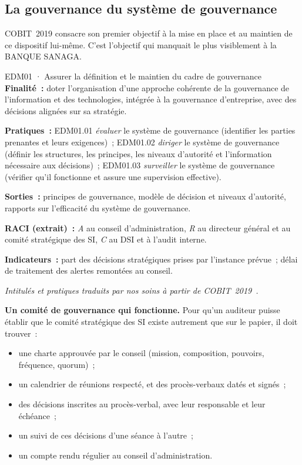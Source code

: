 \subsection{La gouvernance du système de gouvernance}

COBIT~2019 consacre son premier objectif à la mise en place et au maintien
de ce dispositif lui-même. C'est l'objectif qui manquait le plus
visiblement à la BANQUE SANAGA.

\begin{boxobjet}{EDM01 · Assurer la définition et le maintien du cadre de gouvernance}
\textbf{Finalité~:} doter l'organisation d'une approche cohérente de la
gouvernance de l'information et des technologies, intégrée à la
gouvernance d'entreprise, avec des décisions alignées sur sa stratégie.

\textbf{Pratiques~:} EDM01.01 \emph{évaluer} le système de gouvernance
(identifier les parties prenantes et leurs exigences)~; EDM01.02
\emph{diriger} le système de gouvernance (définir les structures, les
principes, les niveaux d'autorité et l'information nécessaire aux
décisions)~; EDM01.03 \emph{surveiller} le système de gouvernance (vérifier
qu'il fonctionne et assure une supervision effective).

\textbf{Sorties~:} principes de gouvernance, modèle de décision et niveaux
d'autorité, rapports sur l'efficacité du système de gouvernance.

\textbf{RACI (extrait)~:} \emph{A} au conseil d'administration, \emph{R} au
directeur général et au comité stratégique des SI, \emph{C} au DSI et à
l'audit interne.

\textbf{Indicateurs~:} part des décisions stratégiques prises par
l'instance prévue~; délai de traitement des alertes remontées au conseil.
\end{boxobjet}
{\small\itshape Intitulés et pratiques traduits par nos soins à partir de
COBIT~2019~\cite{isaca2018cobitobjectifs}.}

\begin{boxprocedure}
\textbf{Un comité de gouvernance qui fonctionne.} Pour qu'un auditeur
puisse établir que le comité stratégique des SI existe autrement que sur
le papier, il doit trouver~:
\begin{itemize}
    \item une charte approuvée par le conseil (mission, composition,
          pouvoirs, fréquence, quorum)~;
    \item un calendrier de réunions respecté, et des procès-verbaux datés
          et signés~;
    \item des décisions inscrites au procès-verbal, avec leur responsable
          et leur échéance~;
    \item un suivi de ces décisions d'une séance à l'autre~;
    \item un compte rendu régulier au conseil d'administration.
\end{itemize}
\end{boxprocedure}

